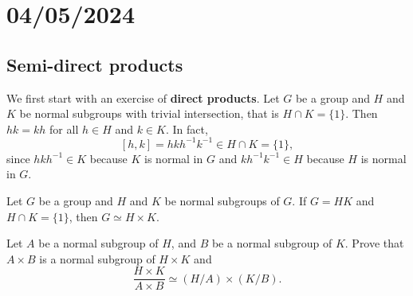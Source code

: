\section{04/05/2024}

\subsection{Semi-direct products}

We first start with an exercise of \textbf{direct products}. Let $G$ be a group and $H$ and $K$ be normal subgroups with trivial intersection, that is $H\cap K=\{1\}$. 
Then $hk=kh$ for all $h\in H$ and $k\in K$. In fact, 
\[
[h,k]=hkh^{-1}k^{-1}\in H\cap K=\{1\}, 
\]
since $hkh^{-1}\in K$ because $K$ is normal in $G$ and 
$kh^{-1}k^{-1}\in H$ because $H$ is normal in $G$. 

\begin{exercise}
\label{xca:direct_product}
Let $G$ be a group and $H$ and $K$ be normal subgroups of $G$.
If $G=HK$ and $H\cap K=\{1\}$, then $G\simeq H\times K$.
\end{exercise}




\begin{exercise}
Let $A$ be a normal subgroup of $H$, and $B$ be a normal subgroup of $K$. 
Prove that $A\times B$ is a normal subgroup of
$H\times K$ and 
\[
\frac{H\times K}{A\times B}\simeq(H/A)\times(K/B).
\]
\end{exercise}

